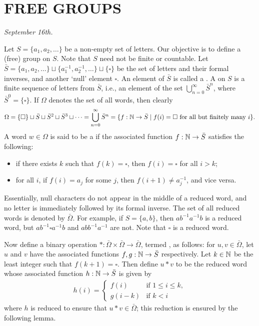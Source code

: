 \chapter{FREE GROUPS}

\textit{September 16th.}

Let $S = \{a_{1},a_{2},\ldots\}$ be a non-empty set of letters. Our objective is to define a (free) group on $S$. Note that $S$ need not be finite or countable. Let $\bar{S} = \{a_{1},a_{2},\ldots\} \sqcup \{a_{1}^{-1},a_{2}^{-1},\ldots\} \sqcup \{\square\}$ be the set of letters and their formal inverses, and another `null' element $\square$. An element of $\bar{S}$ is called a . A  on $S$ is a finite sequence of letters from $\bar{S}$, i.e., an element of the set $\bigcup_{n=0}^{\infty} \bar{S}^{n}$, where $\bar{S}^{0} = \{\square\}$. If $\Omega$ denotes the set of all words,
then clearly
\begin{align}
    \Omega = \{\square\} \sqcup \bar{S} \sqcup \bar{S}^{2} \sqcup \bar{S}^{3} \sqcup \cdots = \bigcup_{n=0}^{\infty} \bar{S}^{n} = \{f:\mathbb{N} \to \bar{S} \mid f(i) = \square \text{ for all but finitely many } i\}.
\end{align}
A word $w \in \Omega$ is said to be a  if the associated function $f:\mathbb{N} \to \bar{S}$ satisfies the following:
\begin{itemize}
    \item if there exists $k$ such that $f(k) = \square$, then $f(i) = \square$ for all $i > k$;
    \item for all $i$, if $f(i) = a_{j}$ for some $j$, then $f(i+1) \neq a_{j}^{-1}$, and vice versa.
\end{itemize}
Essentially, null characters do not appear in the middle of a reduced word, and no letter is immediately followed by its formal inverse. The set of all reduced words is denoted by $\bar{\Omega}$. For example, if $S = \{a,b\}$, then $ab^{-1}a^{-1}b$ is a reduced word, but $ab^{-1}\square a^{-1}b$ and $abb^{-1}a^{-1}$ are not. Note that $\square$ is a reduced word.

Now define a binary operation $\ast:\bar{\Omega}\times\bar{\Omega} \to \bar{\Omega}$, termed , as follows: for $u,v \in \bar{\Omega}$, let $u$ and $v$ have the associated functions $f,g:\mathbb{N} \to \bar{S}$ respectively. Let $k \in \mathbb{N}$ be the least integer such that $f(k+1) = \square$. Then define $u \ast v$ to be the reduced word whose associated function $h:\mathbb{N} \to \bar{S}$ is given by
\begin{align}
    h(i) = \begin{cases}
        f(i) & \text{if } 1 \leq i \leq k,\\
        g(i-k) & \text{if } k < i
    \end{cases}
\end{align}
where $h$ is reduced to ensure that $u \ast v \in \bar{\Omega}$; this reduction is ensured by the following lemma.

